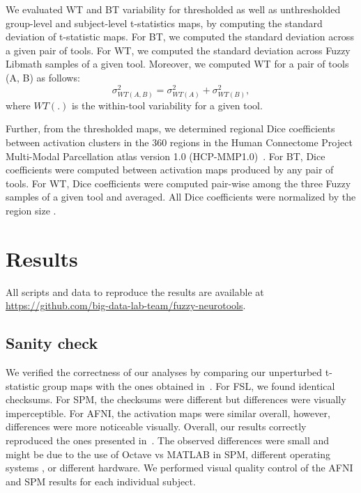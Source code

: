 \documentclass[conference]{IEEEtran}
\begin{document}
We evaluated WT and BT variability for thresholded as well as unthresholded
group-level and subject-level t-statistics maps, by computing the
standard deviation of t-statistic maps. For BT, we computed the standard deviation 
across a given pair of tools.
For WT, we computed the standard deviation across 
Fuzzy Libmath samples of a given tool. Moreover, we computed WT for a pair of tools (A, B) as follows:
\begin{equation}
  \sigma_{WT(A,B)}^2 = \sigma_{WT(A)}^2 + \sigma_{WT(B)}^2,
  \label{eq:wt-pair}
\end{equation}
where $WT(.)$ is the within-tool variability for a given tool.

Further, from the thresholded maps, we determined regional Dice
coefficients between activation clusters in the 360 regions in the Human
Connectome Project Multi-Modal Parcellation atlas version 1.0
(HCP-MMP1.0)~\cite{glasser2016multi}. For BT, Dice coefficients were
computed between activation maps produced by any pair of tools. For WT,
Dice coefficients were computed pair-wise among the three Fuzzy samples of
a given tool and averaged. All Dice coefficients were normalized by the
region size . 

\section{Results}
All scripts and data to reproduce the results are
available at \url{https://github.com/big-data-lab-team/fuzzy-neurotools}.


\subsection{Sanity check}

We verified the correctness of our analyses by comparing our unperturbed
t-statistic group maps with the ones obtained
in~\cite{bowring2019exploring}. For FSL, we found
identical checksums. For SPM, the checksums were different but differences
were visually imperceptible. For AFNI, the activation maps were similar
overall, however, differences were more noticeable visually. 
Overall, our results correctly reproduced
the ones presented in~\cite{bowring2019exploring}. The observed
differences were small and might be due to the use of Octave vs MATLAB in
SPM, different operating systems , or
different hardware. We performed visual quality control of the AFNI and SPM results
for each individual subject.
\end{document}
